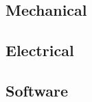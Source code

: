 \subsection{Mechanical}


\vspace{5cm} 
\subsection{Electrical}


\vspace{5cm}
\subsection{Software}
